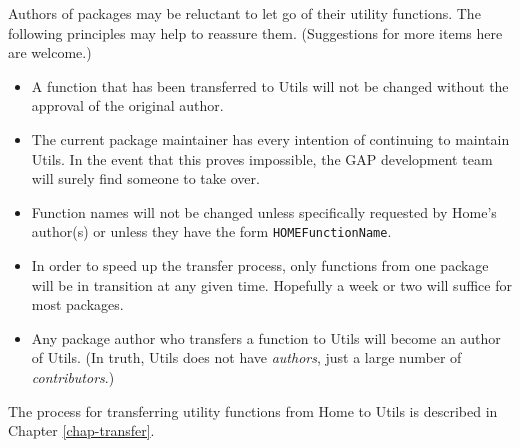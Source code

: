 \documentclass[a4paper,11pt]{report}
\begin{document}
{{ Authors of packages may be reluctant to let go of their utility functions. The
following principles may help to reassure them. (Suggestions for more items
here are welcome.) 
\begin{itemize}
\item  A function that has been transferred to \textsf{Utils} will not be changed without the approval of the original author. 
\item  The current package maintainer has every intention of continuing to maintain \textsf{Utils}. In the event that this proves impossible, the \textsf{GAP} development team will surely find someone to take over. 
\item  Function names will not be changed unless specifically requested by \textsf{Home}'s author(s) or unless they have the form \texttt{HOME{\textunderscore}FunctionName}. 
\item  In order to speed up the transfer process, only functions from one package
will be in transition at any given time. Hopefully a week or two will suffice
for most packages. 
\item  Any package author who transfers a function to \textsf{Utils} will become an author of \textsf{Utils}. (In truth, \textsf{Utils} does not have \emph{authors}, just a large number of \emph{contributors}.) 
\end{itemize}
 

 The process for transferring utility functions from \textsf{Home} to \textsf{Utils} is described in Chapter \ref{chap-transfer}. }

 }

         
\end{document}
